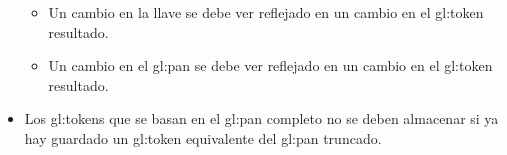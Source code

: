 \begin{itemize}
\begin{itemize}
    \item Un cambio en la llave se debe ver reflejado en un cambio en el
      \gls{gl:token} resultado.

    \item Un cambio en el \gls{gl:pan} se debe ver reflejado en un cambio en el
      \gls{gl:token} resultado.


  \end{itemize}

  \item Los \glspl{gl:token} que se basan en el \gls{gl:pan} completo no se
    deben almacenar si ya hay guardado un \gls{gl:token} equivalente del
    \gls{gl:pan} truncado.


\end{itemize}
